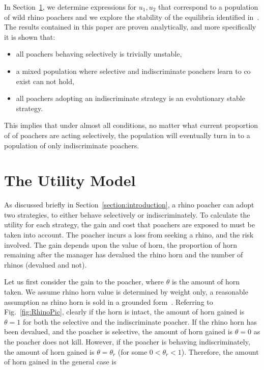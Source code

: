 \documentclass[10pt]{article}
\begin{document}
In Section~\ref{section:the_model}, we determine expressions
for \(u_1, u_2\) that correspond to a population of wild rhino poachers and we
explore the stability of the equilibria identified in~\cite{Lee}. The results
contained in this paper are proven analytically, and more specifically it is 
shown that:

\begin{itemize}
    \item all poachers behaving selectively is trivially unstable,  
    \item a mixed population where selective and indiscriminate poachers
          learn to co exist can not hold,
    \item all poachers adopting an indiscriminate strategy is an evolutionary 
          stable strategy.
\end{itemize}

This implies that under almost all conditions, no matter what current proportion 
of
of poachers are acting selectively, the population will eventually turn in to a 
population of only indiscriminate poachers.

\section{The Utility Model}\label{section:the_model}

As discussed briefly in Section~\ref{section:introduction}, a rhino poacher
can adopt two strategies, to either behave selectively
or indiscriminately. To calculate the utility for each strategy, the gain and cost
that poachers are exposed to must be taken into account. The poacher incurs a
loss from seeking a rhino, and the risk involved. The gain depends upon the value
of horn, the proportion of horn remaining after the manager has devalued the 
rhino horn and the number of rhinos (devalued and not).

Let us first consider the gain to the poacher, where \(\theta\) is the amount of 
horn taken. We assume rhino horn value is determined by weight only, a 
reasonable assumption as rhino horn is sold in a grounded form~\cite{Saverhino}.
Referring to Fig.~\ref{fig:RhinoPic}, clearly if the horn is intact, the amount of
horn gained is \(\theta=1\) for both the selective and the indiscriminate poacher.
If the rhino horn has been devalued, and the poacher is selective, the amount of horn 
gained is \(\theta=0\) as the poacher does not kill. However, if the poacher is 
behaving indiscriminately, the amount of horn gained is \(\theta = \theta_r\)
(for some \(0<\theta_r<1\)). Therefore, the amount of horn gained in the 
general case is
\end{document}
